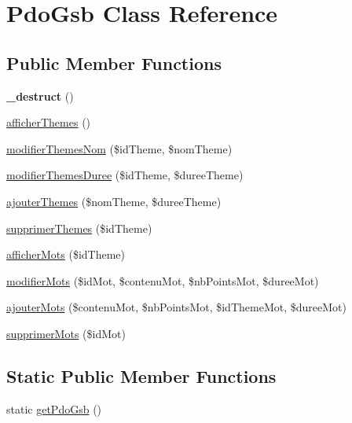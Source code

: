 \hypertarget{class_pdo_gsb}{\section{Pdo\-Gsb Class Reference}
\label{class_pdo_gsb}
}
\subsection*{Public Member Functions}
\begin{DoxyCompactItemize}
\item 
\hypertarget{class_pdo_gsb_a1c6024f681d3956654622d9f28e540a2}{{\bfseries \-\_\-destruct} ()}\label{class_pdo_gsb_a1c6024f681d3956654622d9f28e540a2}

\item 
\hyperlink{class_pdo_gsb_a69eca6fd14dc3603c969985aa148485e}{afficher\-Themes} ()
\item 
\hyperlink{class_pdo_gsb_a5c1a0c71bb9fd7cfa18b15104f4a5b9d}{modifier\-Themes\-Nom} (\$id\-Theme, \$nom\-Theme)
\item 
\hyperlink{class_pdo_gsb_ad29986ea3a95e18a13609712ea01753d}{modifier\-Themes\-Duree} (\$id\-Theme, \$duree\-Theme)
\item 
\hyperlink{class_pdo_gsb_a139b324f49a25586db41b00ef0666d6e}{ajouter\-Themes} (\$nom\-Theme, \$duree\-Theme)
\item 
\hyperlink{class_pdo_gsb_ab3ed6fa43b2858cc13d6f842164e9f37}{supprimer\-Themes} (\$id\-Theme)
\item 
\hyperlink{class_pdo_gsb_a5880ee729b1fd37abb54c3b1c971df7c}{afficher\-Mots} (\$id\-Theme)
\item 
\hyperlink{class_pdo_gsb_a35d174f171da6b722e68ff84e135d1d5}{modifier\-Mots} (\$id\-Mot, \$contenu\-Mot, \$nb\-Points\-Mot, \$duree\-Mot)
\item 
\hyperlink{class_pdo_gsb_a553107c9010c29bb8e015aadb6f093ef}{ajouter\-Mots} (\$contenu\-Mot, \$nb\-Points\-Mot, \$id\-Theme\-Mot, \$duree\-Mot)
\item 
\hyperlink{class_pdo_gsb_ac10f114c36c8ae0f328ad6ff6168d437}{supprimer\-Mots} (\$id\-Mot)
\end{DoxyCompactItemize}
\subsection*{Static Public Member Functions}
\begin{DoxyCompactItemize}
\item 
static \hyperlink{class_pdo_gsb_a37ab3ed998137aeaf4d581365520067e}{get\-Pdo\-Gsb} ()
\end{DoxyCompactItemize}


